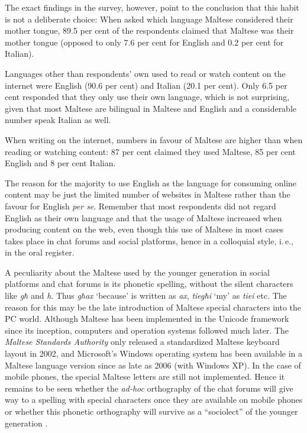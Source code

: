 \documentclass[]{../../metanetpaper}
\begin{document}
\begin{multicols}{2}
The exact findings in the survey, however, point to the conclusion that this habit is not a deliberate choice: When asked which language Maltese considered their mother tongue, 89.5 per cent of the respondents claimed that Maltese was their mother tongue (opposed to only 7.6 per cent for English and 0.2 per cent for Italian). 

Languages other than respondents' own used to read or watch content on the internet were English (90.6 per cent) and Italian (20.1 per cent). Only 6.5 per cent responded that they only use their own language, which is not surprising, given that most Maltese are bilingual in Maltese and English and a considerable number speak Italian as well.

When writing on the internet, numbers in favour of Maltese are higher than when reading or watching content: 87 per cent claimed they used Maltese, 85 per cent English and 8 per cent Italian. 

The reason for the majority to use English as the language for consuming online content may be just the limited number of websites in Maltese rather than the favour for English \emph{per se}. Remember that most respondents did not regard English as their own language and that the usage of Maltese increased when producing content on the web, even though this use of Maltese in most cases takes place in chat forums and social platforms, hence in a colloquial style, i.\,e., in the oral register. 

A peculiarity about the Maltese used by the younger generation in social platforms and chat forums is its phonetic spelling, without the silent characters like \emph{għ} and \emph{h}. Thus \emph{għax} `because' is written as \emph{ax}, \emph{tiegħi} `my' as \emph{tiei} etc. The reason for this may be the late introduction of Maltese special characters into the PC world. Although Maltese has been implemented in the Unicode framework since its inception, computers and operation systems followed much later. The \emph{Maltese Standards Authority} only released a standardized Maltese keyboard layout in 2002, and Microsoft's Windows operating system has been available in a Maltese language version since as late as 2006 (with Windows XP). In the case of mobile phones, the special Maltese letters are still not implemented. Hence it remains to be seen whether the \emph{ad-hoc} orthography of the chat forums will give way to a spelling with special characters once they are available on mobile phones or whether this phonetic orthography will survive as a ``sociolect'' of the younger generation \cite{Fabri:2011b}.


\end{multicols}
\end{document}
